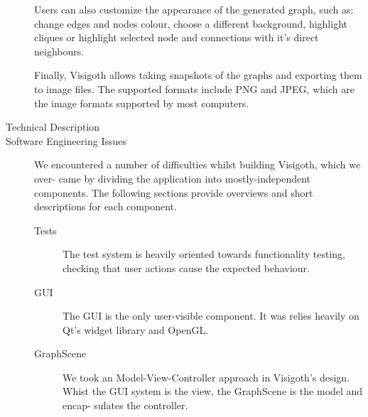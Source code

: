\documentclass[a4paper,11pt]{article}
\begin{document}
\begin{description}
    Users can also customize the appearance of the generated graph, such as:
    change edges and nodes colour, choose a different background, highlight
    cliques or highlight selected node and connections with it's direct
    neighbours.

    Finally, Visigoth allows taking snapshots of the graphs and exporting them
    to image files. The supported formats include PNG and JPEG, which are the
    image formats supported by most computers.

	\item[Technical Description]

	\item[Software Engineering Issues]

    We encountered a number of difficulties whilst building Visigoth, which we
    over- came by dividing the application into mostly-independent components.
    The following sections provide overviews and short descriptions for each
    component.

    \begin{description}
      \item[Tests] The test system is heavily oriented towards functionality
        testing, checking that user actions cause the expected behaviour.

      \item[GUI] The GUI is the only user-visible component. It was relies
        heavily on Qt's widget library and OpenGL.

      \item[GraphScene] We took an Model-View-Controller approach in Visigoth's
        design. Whist the GUI system is the view, the GraphScene is the model
        and encap- sulates the controller.


\end{description}
\end{description}
\end{document}
